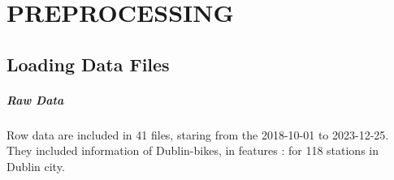      

\chapter{P\normalsize{REPROCESSING}}    
\section{Loading Data Files}
\paragraph{Raw Data}
Row data \cite{CityBikedataset} are included in 41 files, staring from the 2018-10-01 to 
2023-12-25. They included information of Dublin-bikes, in features 
: for 118 stations in Dublin city. 

